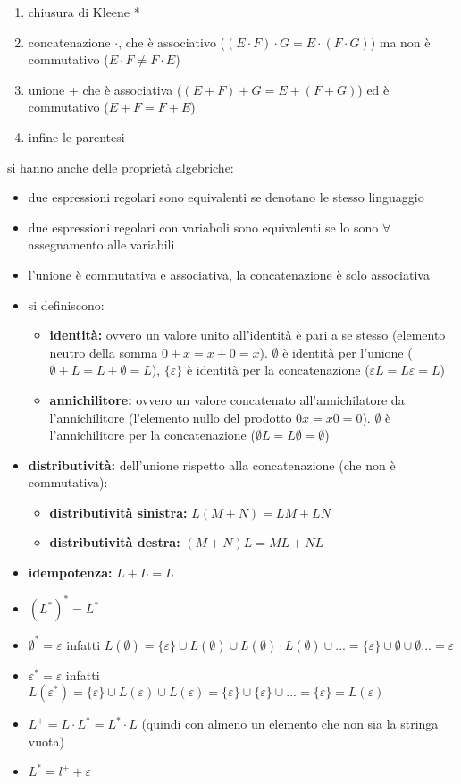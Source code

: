 \documentclass[a4paper,12pt, oneside]{book}
\begin{document}
\begin{enumerate}
\item chiusura di Kleene *
\item concatenazione $\cdot$, che è associativo ($(E\cdot F)\cdot G=E\cdot (F\cdot G)$) ma non è commutativo ($E\cdot F\neq F\cdot E$)
\item unione + che è associativa ($(E+ F)+ G=E+ (F+ G)$) ed è commutativo ($E+F= F+ E$)
\item infine le parentesi
\end{enumerate}
si hanno anche delle proprietà algebriche:
\begin{itemize}
\item due espressioni regolari sono equivalenti se denotano le stesso linguaggio
\item due espressioni regolari con variaboli sono equivalenti se lo sono $\forall$ assegnamento alle variabili
\item l'unione è commutativa e associativa, la concatenazione è solo associativa
\item si definiscono:
\begin{itemize}
\item \textbf{identità:} ovvero un valore unito all'identità è pari a se stesso (elemento neutro della somma $0+x=x+0=x$). $\emptyset$ è identità per l'unione ($\emptyset+L=L+\emptyset=L$), $\{\varepsilon\}$ è identità per la concatenazione ($\varepsilon L=L\varepsilon=L$)
\item \textbf{annichilitore:} ovvero un valore concatenato all'annichilatore da l'annichilitore (l'elemento nullo del prodotto $0x=x0=0$).  $\emptyset$ è l'annichilitore per la concatenazione ($\emptyset L=L\emptyset=\emptyset$)
\end{itemize}
\item \textbf{distributività:} dell'unione rispetto alla concatenazione (che non è commutativa):
\begin{itemize}
\item \textbf{distributività sinistra:} $L(M+N)=LM+LN$
\item \textbf{distributività destra:} $(M+N)L=ML+NL$
\end{itemize}
\item \textbf{idempotenza:} $L+L=L$
\item $(L^*)^*=L^*$
\item $\emptyset^*=\varepsilon$ infatti $L(\emptyset)=\{\varepsilon\}\cup L(\emptyset)\cup L(\emptyset)\cdot L(\emptyset)\cup...=\{\varepsilon\}\cup \emptyset\cup \emptyset...=\varepsilon$
\item $\varepsilon^*=\varepsilon$ infatti $L(\varepsilon^*)=\{\varepsilon\}\cup L(\varepsilon)\cup L(\varepsilon)=\{\varepsilon\}\cup \{\varepsilon\}\cup ...=\{\varepsilon\}=L(\varepsilon)$
\item $L^+=L\cdot L^*=L^*\cdot L$ (quindi con almeno un elemento che non sia la stringa vuota)
\item $L^*=l^++\varepsilon$  
\end{itemize}
\end{document}

